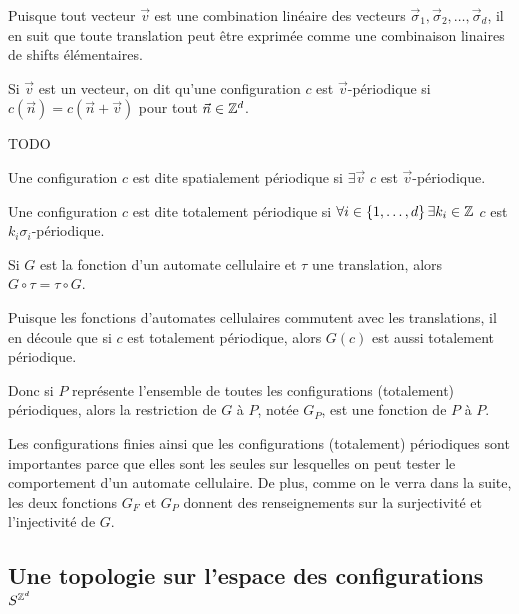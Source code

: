 	Puisque tout vecteur $\vec v$ est une combination linéaire des vecteurs $\vec \sigma_1, \vec \sigma_2, \ldots, \vec \sigma_d$, il en suit que toute translation peut être exprimée comme une combinaison linaires de shifts élémentaires.

\begin{definition}
	Si $\vec v$ est un vecteur, on dit qu'une configuration $c$ est $\vec v$-périodique si  $c(\vec n) = c (\vec n + \vec v)$ pour tout $\vec n \in \mathbb{Z} ^d$.
\end{definition}

\begin{exemple}
	TODO
\end{exemple}

\begin{definition}
	Une configuration $c$ est dite spatialement périodique si $\exists \vec v$ \tq $c$ est $\vec v$-périodique.
\end{definition}

\begin{definition}
	Une configuration $c$ est dite totalement périodique si $\forall i \in \left\{1,\ldots,d\right\}\exists k_i\in \mathbb{Z}$ \tq $c$ est $k_i\sigma_i$-périodique.
\end{definition}

\begin{prop}
	Si $G$ est la fonction d'un automate cellulaire et $\tau$ une translation, alors $G \circ \tau = \tau \circ G$.
\end{prop}

	Puisque les fonctions d'automates cellulaires commutent avec les translations, il en découle que si $c$ est totalement périodique, alors $G(c)$
	est aussi totalement périodique.

	Donc si $P$ représente l'ensemble de toutes les configurations (totalement) périodiques, alors la restriction de $G$ à $P$,  notée $G_P$, est une fonction de $P$ à $P$.

Les configurations finies ainsi que les configurations (totalement) périodiques sont importantes parce que elles sont les seules sur lesquelles on peut tester le comportement d'un automate cellulaire. De plus, comme on le verra dans la suite,  les deux fonctions $G_F$ et $G_P$ donnent des renseignements sur la surjectivité et l'injectivité de $G$.



\subsection{Une topologie sur l'espace des configurations $S^{\mathbb{Z}^d}$}


